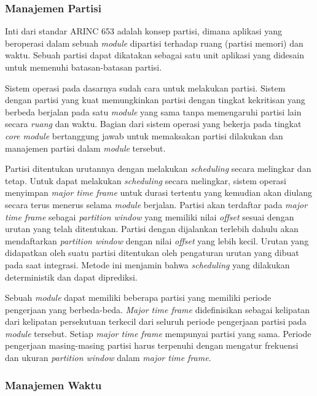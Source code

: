 \subsubsection[Manajemen Partisi]{Manajemen Partisi}

Inti dari standar ARINC 653 adalah konsep partisi, dimana aplikasi yang beroperasi dalam sebuah
\textit{module} dipartisi terhadap ruang (partisi memori) dan waktu.  Sebuah partisi dapat
dikatakan sebagai satu unit aplikasi yang didesain untuk memenuhi batasan-batasan partisi.

Sistem operasi pada dasarnya sudah cara untuk melakukan partisi.  Sistem dengan partisi yang
kuat memungkinkan partisi dengan tingkat kekritisan yang berbeda berjalan pada satu
\textit{module} yang sama tanpa memengaruhi partisi lain secara \textit{ruang} dan waktu.
Bagian dari sistem operasi yang bekerja pada tingkat \textit{core module} bertanggung jawab
untuk memaksakan partisi dilakukan dan manajemen partisi dalam \textit{module} tersebut.

Partisi ditentukan urutannya dengan melakukan \textit{scheduling} secara melingkar dan tetap.
Untuk dapat melakukan \textit{scheduling} secara melingkar, sistem operasi menyimpan
\textit{major time frame} untuk durasi tertentu yang kemudian akan diulang secara terus menerus
selama \textit{module} berjalan.  Partisi akan terdaftar pada \textit{major time frame} sebagai
\textit{partition window} yang memiliki nilai \textit{offset} sesuai dengan urutan yang telah
ditentukan.  Partisi dengan dijalankan terlebih dahulu akan mendaftarkan \textit{partition
window} dengan nilai \textit{offset} yang lebih kecil.  Urutan yang didapatkan oleh suatu
partisi ditentukan oleh pengaturan urutan yang dibuat pada saat integrasi.  Metode ini menjamin
bahwa \textit{scheduling} yang dilakukan deterministik dan dapat diprediksi.

Sebuah \textit{module} dapat memiliki beberapa partisi yang memiliki periode pengerjaan yang
berbeda-beda.  \textit{Major time frame} didefinisikan sebagai kelipatan dari kelipatan
persekutuan terkecil dari seluruh periode pengerjaan partisi pada \textit{module} tersebut.
Setiap \textit{major time frame} mempunyai partisi yang sama.  Periode pengerjaan masing-masing
partisi harus terpenuhi dengan mengatur frekuensi dan ukuran \textit{partition window} dalam
\textit{major time frame}.

\subsubsection{Manajemen Waktu}

